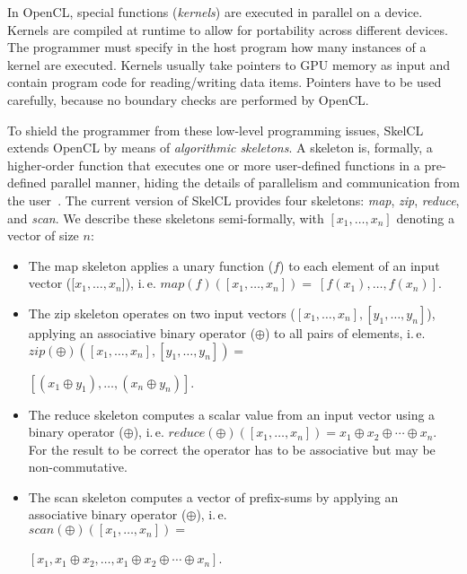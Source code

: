 In OpenCL, special functions (\emph{kernels}) are executed in parallel on a device.
Kernels are compiled at runtime to allow for portability across different devices.
The programmer must specify in the host program how many instances of a kernel are executed.
Kernels usually take pointers to GPU memory as input and contain program code for reading/writing data items.
Pointers have to be used carefully, because no boundary checks are performed by OpenCL.

To shield the programmer from these low-level programming issues, SkelCL extends OpenCL by means of \emph{algorithmic skeletons}.
A skeleton is, formally, a higher-order function that executes one or more user-defined functions in a pre-defined parallel manner, hiding the details of parallelism and communication from the user~\cite{RaG-03}.
The current version of SkelCL provides four skeletons: \emph{map}, \emph{zip}, \emph{reduce}, and \emph{scan}.
We describe these skeletons semi-formally, with $[x_1, \dots, x_n]$ denoting a vector of size $n$:

\begin{itemize}
  \item The map skeleton applies a unary function ($f$) to each element of an input vector
        ([$x_1, \dots, x_n$]), i.\,e. $map(f)([x_1, \dots, x_n])=\ [f(x_1), \dots, f(x_n)]$.

  \item The zip skeleton operates on two input vectors ($[x_1, \dots, x_n], [y_1, \dots, y_n]$),
        applying an associative binary operator ($\oplus$) to all pairs of elements, i.\,e.\\
        $zip(\oplus)([x_1, \dots, x_n], [y_1, \dots, y_n]) =$\\\strut\hspace{1em}$[(x_1\oplus y_1), \dots, (x_n\oplus y_n)]$.

  \item The reduce skeleton computes a scalar value from an input vector using a binary operator ($\oplus$), i.\,e.
        $reduce(\oplus)([x_1, \dots, x_n]) = x_1\oplus x_2 \oplus \cdots \oplus x_n$.\\
        For the result to be correct the operator has to be associative but may be non-commutative.

  \item The scan skeleton computes a vector of prefix-sums by applying an associative binary operator ($\oplus$), i.\,e.\\
        $scan(\oplus)([x_1, \dots, x_n]) =$\\\strut\hspace{1em}$[x_1, x_1\oplus x_2, \dots, x_1\oplus x_2\oplus \cdots \oplus x_{n}]$.
\end{itemize}

